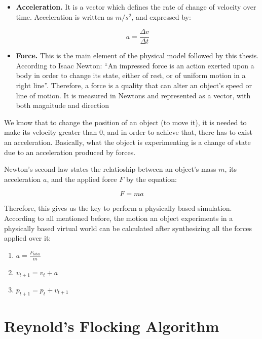 \begin{itemize}
\item{{\bf Acceleration.} It is a vector which defines the rate of change of velocity over time. Acceleration is written as $m/s^2$, and expressed by:}

\begin{equation}
  a=\frac{\Delta v}{\Delta t}
\end{equation}

\item{{\bf Force.} This is the main element of the physical model followed by this thesis. 
 According to Isaac Newton: ``An impressed force is an action exerted upon a body in order to change its state, either of rest, or of uniform motion in a right line''.
 Therefore, a force is a quality that can alter an object's speed or line of motion. It is measured in Newtons and represented as a vector, with both magnitude and direction}

\end{itemize}

We know that to change the position of an object (to move it), it is needed to make its velocity greater than 0, and in order to achieve that, there has to exist an acceleration. Basically, what the object is experimenting is a change of state due to an acceleration produced by forces.

Newton's second law states the relatioship between an object's mass $m$, its acceleration $a$, and the applied force $F$ by the equation:

\begin{equation}
  F=ma
\end{equation}

Therefore, this gives us the key to perform a physically based simulation. According to all mentioned before, the motion an object experiments in a physically based virtual world can be calculated after synthesizing all the forces applied over it:

\begin{enumerate}
\item $a = \frac{F_{total}}{m}$
\item $v_{t+1} = v_{t}+a$
\item $p_{t+1} = p_{t}+v_{t+1}$
\end{enumerate}

\section{Reynold's Flocking Algorithm}

